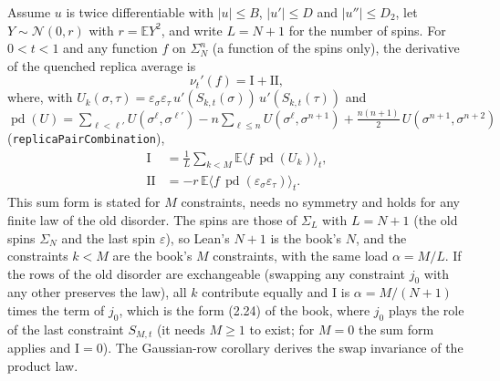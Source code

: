 \begin{proposition}\label{prop:sg-tal:perceptron-smart-path-derivative}
  \leanok
Assume $u$ is twice differentiable with $|u|\le B$, $|u'|\le D$ and $|u''|\le D_2$, let $Y\sim\mathcal N(0,r)$
with $r=\mathbb E Y^2$, and write $L=N+1$ for the number of spins. For $0<t<1$ and any function $f$ on
$\Sigma_N^n$ (a function of the spins only), the derivative of the quenched replica average is
\[
 \nu_t'(f)=\mathrm{I}+\mathrm{II},
\]
where, with $U_k(\sigma,\tau)=\varepsilon_\sigma\varepsilon_\tau\,u'(S_{k,t}(\sigma))\,u'(S_{k,t}(\tau))$ and
$\operatorname{pd}(U)=\sum_{\ell<\ell'}U(\sigma^\ell,\sigma^{\ell'})-n\sum_{\ell\le n}U(\sigma^\ell,\sigma^{n+1})
+\tfrac{n(n+1)}2\,U(\sigma^{n+1},\sigma^{n+2})$ (\texttt{replicaPairCombination}),
\begin{align*}
 \mathrm{I}&=\frac1L\sum_{k<M}\mathbb E\bigl\langle f\,\operatorname{pd}(U_k)\bigr\rangle_t,\\
 \mathrm{II}&=-r\,\mathbb E\bigl\langle f\,\operatorname{pd}(\varepsilon_\sigma\varepsilon_\tau)\bigr\rangle_t .
\end{align*}
This sum form is stated for $M$ constraints, needs no symmetry and holds for any finite law of the old disorder.
The spins are those of $\Sigma_L$ with $L=N+1$ (the old spins $\Sigma_N$ and the last spin $\varepsilon$), so Lean's $N+1$ is the
book's $N$, and the constraints $k<M$ are the book's $M$ constraints, with the same load $\alpha=M/L$. If the rows of the old
disorder are exchangeable (swapping any constraint $j_0$ with any other preserves the law), all $k$ contribute equally and $\mathrm{I}$ is
$\alpha=M/(N+1)$ times the term of $j_0$, which is the form (2.24) of the book, where $j_0$ plays the role of the last constraint $S_{M,t}$
(it needs $M\ge1$ to exist; for $M=0$ the sum form applies and $\mathrm I=0$). The Gaussian-row
corollary derives the swap invariance of the product law.
\end{proposition}
